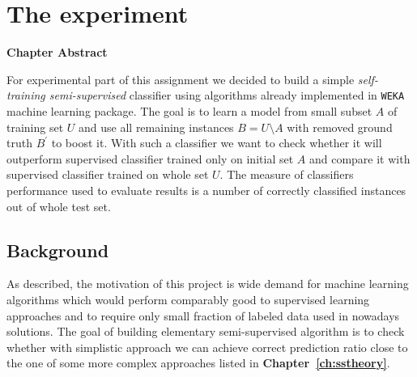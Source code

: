 \documentclass[12pt, a4paper, pdflatex]{report}
\newenvironment{chapabstract}
{
	\vspace{0.5cm}
	\small
	\begin{center}
    \bfseries Chapter Abstract
    \end{center}
}{\vspace{1.5cm}}
\begin{document}
\chapter{The experiment}

\begin{chapabstract}
For experimental part of this assignment we decided to build a simple \emph{self-training semi-supervised} classifier using algorithms already implemented in \texttt{WEKA} machine learning package. The goal is to learn a model from small subset $A$ of training set $U$ and use all remaining instances $B = U \setminus A$ with removed ground truth $B^{\prime}$ to boost it. With such a classifier we want to check whether it will outperform supervised classifier trained only on initial set $A$ and compare it with supervised classifier trained on whole set $U$. The measure of classifiers performance used to evaluate results is a number of correctly classified instances out of whole test set.
\end{chapabstract}

\section{Background}
As described, the motivation of this project is wide demand for machine learning algorithms which would perform comparably good to supervised learning approaches and to require only small fraction of labeled data used in nowadays solutions. The goal of building elementary semi-supervised algorithm is to check whether with simplistic approach we can achieve correct prediction ratio close to the one of some more complex approaches listed in \textbf{Chapter~\ref{ch:sstheory}}. 
\end{document}
